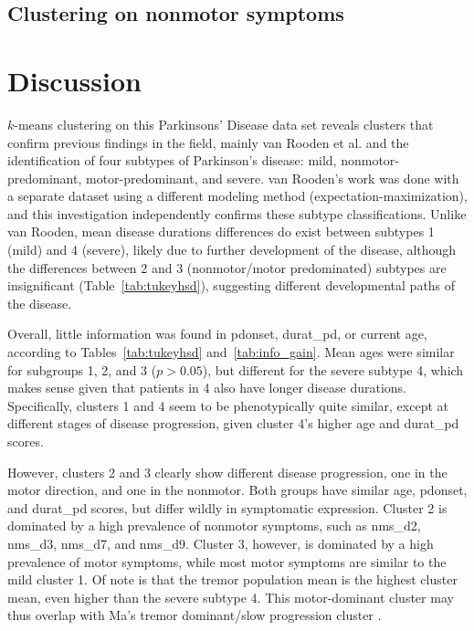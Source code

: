 \documentclass[preprint,3p]{elsarticle} %
\begin{document}
\subsection{Clustering on nonmotor symptoms}

\section{Discussion}

$k$-means clustering on this Parkinsons' Disease data set reveals clusters that confirm previous
findings in the field, mainly van Rooden et al. \cite{vanrooden10} and the identification of four
subtypes of Parkinson's disease: mild, nonmotor-predominant, motor-predominant, and severe.  van
Rooden's work was done with a separate dataset using a different modeling method
(expectation-maximization), and this investigation independently confirms these subtype
classifications. Unlike van Rooden, mean disease durations differences do exist between subtypes 1
(mild) and 4 (severe), likely due to further development of the disease, although the differences
between 2 and 3 (nonmotor/motor predominated) subtypes are insignificant
(Table~\ref{tab:tukeyhsd}), suggesting different developmental paths of the disease.

Overall, little information was found in pdonset,
durat\_pd, or current age, according to Tables~\ref{tab:tukeyhsd}
and~\ref{tab:info_gain}.  Mean ages were similar for subgroups 1, 2, and 3 ($p >
0.05$), but different for the severe subtype 4, which makes sense given that
patients in 4 also have longer disease durations. Specifically, clusters 1 and
4 seem to be phenotypically quite similar, except at different stages of
disease progression, given cluster 4's higher age and durat\_pd scores.

However, clusters 2 and 3 clearly show different disease progression, one in
the motor direction, and one in the nonmotor. Both groups have similar age,
pdonset, and durat\_pd scores, but differ wildly in symptomatic expression.
Cluster 2 is dominated by a high prevalence of nonmotor symptoms, such as
nms\_d2, nms\_d3, nms\_d7, and nms\_d9. Cluster 3, however, is dominated by a
high prevalence of motor symptoms, while most motor symptoms are similar to the
mild cluster 1. Of note is that the tremor population mean
is the highest cluster mean, even higher than the severe subtype 4. This
motor-dominant cluster may thus overlap with Ma's tremor dominant/slow
progression cluster \cite{ma15}.
\end{document}
